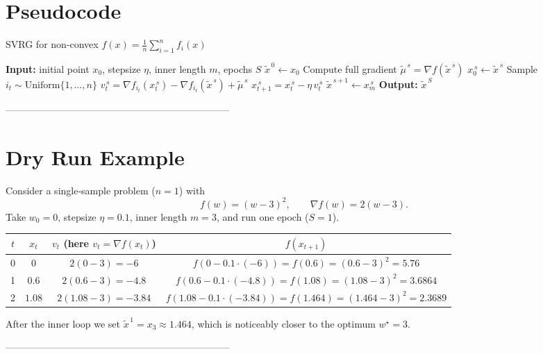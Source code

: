 \documentclass{article}
\begin{document}
\section*{Pseudocode}
\begin{algorithm}[H]
\caption{SVRG for non‑convex $f(x)=\frac1n\sum_{i=1}^n f_i(x)$}
\begin{algorithmic}[1]
\STATE \textbf{Input:} initial point $x_0$, stepsize $\eta$, inner length $m$, epochs $S$
\STATE $ \tilde{x}^{\,0}\gets x_0$
    \STATE Compute full gradient $\tilde{\mu}^{\,s}= \nabla f(\tilde{x}^{\,s})$
    \STATE $x_0^{\,s}\gets \tilde{x}^{\,s}$
        \STATE Sample $i_t\sim\text{Uniform}\{1,\dots ,n\}$
        \STATE $v_t^{\,s}= \nabla f_{i_t}(x_t^{\,s})-\nabla f_{i_t}(\tilde{x}^{\,s})+\tilde{\mu}^{\,s}$
        \STATE $x_{t+1}^{\,s}= x_t^{\,s}-\eta\,v_t^{\,s}$
    \ENDFOR
    \STATE $\tilde{x}^{\,s+1}\gets x_m^{\,s}$
\ENDFOR
\STATE \textbf{Output:} $\tilde{x}^{\,S}$
\end{algorithmic}
\end{algorithm}

---------------------------------------------------------------------

\section*{Dry Run Example}
Consider a single‑sample problem ($n=1$) with  
\[
f(w)=(w-3)^2,\qquad \nabla f(w)=2(w-3).
\]
Take $w_0=0$, stepsize $\eta=0.1$, inner length $m=3$, and run one epoch ($S=1$).

\begin{center}
\begin{tabular}{c|c|c|c}
$t$ & $x_t$ & $v_t$ (here $v_t=\nabla f(x_t)$) & $f(x_{t+1})$\\\hline
0 & $0$ & $2(0-3)=-6$ & $f(0-0.1\cdot(-6))=f(0.6)= (0.6-3)^2=5.76$\\
1 & $0.6$ & $2(0.6-3)=-4.8$ & $f(0.6-0.1\cdot(-4.8))=f(1.08)= (1.08-3)^2=3.6864$\\
2 & $1.08$ & $2(1.08-3)=-3.84$ & $f(1.08-0.1\cdot(-3.84))=f(1.464)= (1.464-3)^2=2.3689$\\
\end{tabular}
\end{center}
After the inner loop we set $\tilde{x}^{\,1}=x_3\approx1.464$, which is noticeably closer to the optimum $w^\star=3$.

---------------------------------------------------------------------
\end{document}
